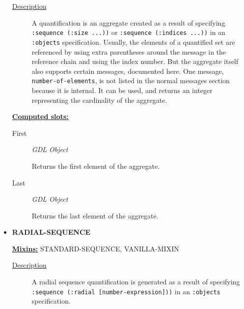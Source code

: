 \documentclass [11pt]{book}
\begin{document}
\begin{itemize}
\begin{description}
\item [
\underline{Description}]


A quantification is an aggregate created as a result of specifying \texttt{:sequence (:size ...))} or
\texttt{:sequence (:indices ...))} in an \texttt{:objects} specification. Usually, the elements of a quantified set are referenced by using
extra parentheses around the message in the reference chain and using the index number. But the aggregate itself also supports certain
messages, documented here. One message, \texttt{number-of-elements}, is not listed in the normal messages section because it is 
internal. It can be used, and returns an integer representing the cardinality of the aggregate.



\end{description}








\textbf{
\underline{Computed slots:}}

\begin{description}

\item [First]
\emph{GDL Object}

 Returns the first element of the aggregate.




\item [Last]
\emph{GDL Object}

 Returns the last element of the aggregate.




\end{description}







\item {}
\textbf{RADIAL-SEQUENCE}


\textbf{
\underline{Mixins:}} STANDARD-SEQUENCE, VANILLA-MIXIN





\begin{description}

\item [
\underline{Description}]


A radial sequence quantification is generated as a result of specifying 
\texttt{:sequence (:radial [number-expression]))} in an \texttt{:objects} specification.




\end{description}
\end{itemize}
\end{document}
